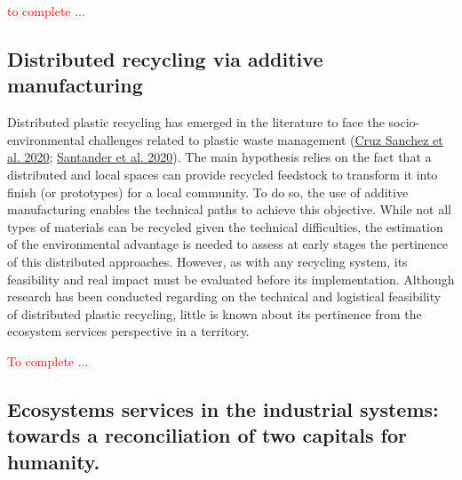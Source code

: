 \documentclass[
  14pt,
]{extarticle}
\begin{document}
\textcolor{red}{to complete ... }

\hypertarget{distributed-recycling-via-additive-manufacturing}{%
\subsection{Distributed recycling via additive manufacturing}\label{distributed-recycling-via-additive-manufacturing}}

Distributed plastic recycling has emerged in the literature to face the socio-environmental challenges related to plastic waste management (\protect\hyperlink{ref-CruzSanchez2020}{Cruz Sanchez et al. 2020}; \protect\hyperlink{ref-Santander2020}{Santander et al. 2020}).
The main hypothesis relies on the fact that a distributed and local spaces can provide recycled feedstock to transform it into finish (or prototypes) for a local community.
To do so, the use of additive manufacturing enables the technical paths to achieve this objective.
While not all types of materials can be recycled given the technical difficulties, the estimation of the environmental advantage is needed to assess at early stages the pertinence of this distributed approaches.
However, as with any recycling system, its feasibility and real impact must be evaluated before its implementation.
Although research has been conducted regarding on the technical and logistical feasibility of distributed plastic recycling, little is known about its pertinence from the ecosystem services perspective in a territory.

\textcolor{red}{ To complete ...}

\hypertarget{ecosystems-services-in-the-industrial-systems-towards-a-reconciliation-of-two-capitals-for-humanity.}{%
\subsection{Ecosystems services in the industrial systems: towards a reconciliation of two capitals for humanity.}\label{ecosystems-services-in-the-industrial-systems-towards-a-reconciliation-of-two-capitals-for-humanity.}}
\end{document}
